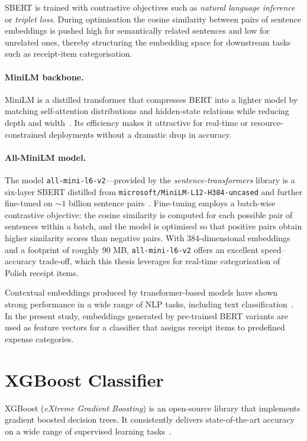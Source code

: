 \documentclass{SGGW-thesis-EN}
\begin{document}
SBERT is trained with contrastive objectives such as \emph{natural language inference} or
\emph{triplet loss}.
During optimisation the cosine similarity between pairs of sentence embeddings is pushed high
for semantically related sentences and low for unrelated ones, thereby structuring the
embedding space for downstream tasks such as receipt-item categorisation.

\paragraph{MiniLM backbone.}
MiniLM is a distilled transformer that compresses BERT into a lighter model by matching
self-attention distributions and hidden-state relations while reducing depth and width~\cite{wang2020minilmdeepselfattentiondistillation}.
Its efficiency makes it attractive for real-time or resource-constrained deployments without
a dramatic drop in accuracy.

\paragraph{All-MiniLM model.}
The model \texttt{all-mini-l6-v2}—provided by the \emph{sentence-transformers} library is a
six-layer SBERT distilled from \texttt{microsoft/MiniLM-L12-H384-uncased} and further
fine-tuned on \(\sim 1\) billion sentence pairs~\cite{reimers2021allminilm}.
Fine-tuning employs a batch-wise contrastive objective: the cosine similarity is computed for
each possible pair of sentences within a batch, and the model is optimised so that positive
pairs obtain higher similarity scores than negative pairs.
With 384-dimensional embeddings and a footprint of roughly 90 MB,
\texttt{all-mini-l6-v2} offers an excellent speed–accuracy trade-off, which this thesis
leverages for real-time categorisation of Polish receipt items.

Contextual embeddings produced by transformer-based models have shown strong performance in a
wide range of NLP tasks, including text classification~\cite{devlin2019bertpretrainingdeepbidirectional}.
In the present study, embeddings generated by pre-trained BERT variants are used as feature
vectors for a classifier that assigns receipt items to predefined expense categories.

\section{XGBoost Classifier}

XGBoost (\emph{eXtreme Gradient Boosting}) is an open-source library that implements gradient boosted decision trees.
It consistently delivers state-of-the-art accuracy on a wide range of supervised learning tasks~\cite{Chen_2016}.
\end{document}
